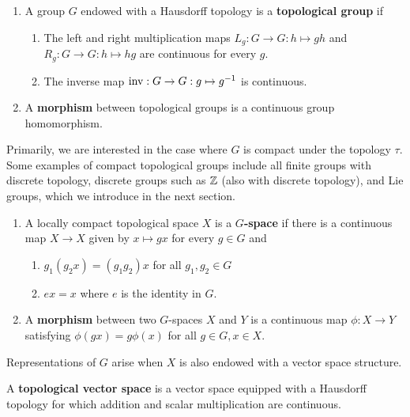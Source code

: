 \documentclass[a4paper]{article}
\begin{document}
\begin{defi}\end{defi}
\begin{enumerate}
    \item A group $G$ endowed with a Hausdorff topology is a \textbf{topological group} if 
    \begin{enumerate}
        \item The left and right multiplication maps $L_g : G \to G : h \mapsto gh$ and $R_g : G \to G : h \mapsto hg$ are continuous for every $g$.
        \item The inverse map $\operatorname{inv}: G \to G : g \mapsto g^{-1}$  is continuous.
    \end{enumerate}
    \item A \textbf{morphism} between topological groups is a continuous group homomorphism.
\end{enumerate}

Primarily, we are interested in the case where $G$ is compact under the topology $\tau$. Some examples of compact topological groups include all finite groups with discrete topology, discrete groups such as $\mathbb{Z}$ (also with discrete topology), and Lie groups, which we introduce in the next section. 

\begin{defi}[G-space]\end{defi}
\begin{enumerate}
    \item A locally compact topological space $X$ is a $G$\textbf{-space} if there is a continuous map $X \to X$ given by $x \mapsto gx$ for every $g\in G$ and
    \begin{enumerate}
        \item $g_1 (g_2 x) = (g_1 g_2)x$ for all $g_1, g_2 \in G$
        \item $ex = x$ where $e$ is the identity in $G$.
    \end{enumerate} 
    \item A \textbf{morphism} between two $G$-spaces $X$ and $Y$ is a continuous map $\phi: X \to Y$ satisfying $\phi(gx) = g \phi(x)$ for all $g \in G, x \in X$. 
\end{enumerate}

Representations of $G$ arise when $X$ is also endowed with a vector space structure. 

\begin{defi}
    A \textbf{topological vector space} is a vector space equipped with a Hausdorff topology for which addition and scalar multiplication are continuous.
\end{defi}
\end{document}
